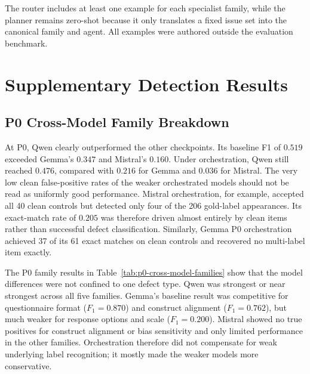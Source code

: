 \documentclass[11pt,a4paper]{article}
\begin{document}
The router includes at least one example for each specialist family, while the
planner remains zero-shot because it only translates a fixed issue set into the
canonical family and agent. All examples were authored outside the evaluation
benchmark.

\clearpage
\section{Supplementary Detection Results}
\label{app:detection}

\subsection{P0 Cross-Model Family Breakdown}

At P0, Qwen clearly outperformed the other checkpoints. Its baseline F1 of
$0.519$ exceeded Gemma's $0.347$ and Mistral's $0.160$. Under orchestration,
Qwen still reached $0.476$, compared with $0.216$ for Gemma and $0.036$ for
Mistral. The very low clean false-positive rates of the weaker orchestrated
models should not be read as uniformly good performance. Mistral orchestration,
for example, accepted all 40 clean controls but detected only four of the 206
gold-label appearances. Its exact-match rate of $0.205$ was therefore driven
almost entirely by clean items rather than successful defect classification.
Similarly, Gemma P0 orchestration achieved 37 of its 61 exact matches on clean
controls and recovered no multi-label item exactly.

The P0 family results in Table~\ref{tab:p0-cross-model-families} show that the
model differences were not confined to one defect type. Qwen was strongest or
near strongest across all five families. Gemma's baseline result was competitive
for questionnaire format ($F_1=0.870$) and construct alignment ($F_1=0.762$),
but much weaker for response options and scale ($F_1=0.200$). Mistral showed no
true positives for construct alignment or bias sensitivity and only limited
performance in the other families. Orchestration therefore did not compensate
for weak underlying label recognition; it mostly made the weaker models more
conservative.
\end{document}
